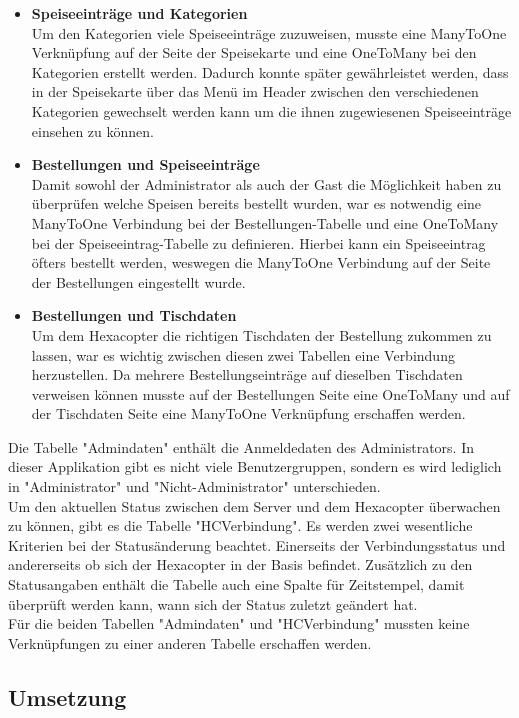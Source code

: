 \begin{itemize}
    \item \textbf{Speiseeinträge und Kategorien}\\
Um den Kategorien viele Speiseeinträge zuzuweisen, musste eine ManyToOne Verknüpfung auf der Seite der Speisekarte und eine OneToMany bei den Kategorien erstellt werden. Dadurch konnte später gewährleistet werden, dass in der Speisekarte über das Menü im Header zwischen den verschiedenen Kategorien gewechselt werden kann um die ihnen zugewiesenen Speiseeinträge einsehen zu können.
    \item \textbf{Bestellungen und Speiseeinträge}\\
Damit sowohl der Administrator als auch der Gast die Möglichkeit haben zu überprüfen welche Speisen bereits bestellt wurden, war es notwendig eine ManyToOne Verbindung bei der Bestellungen-Tabelle und eine OneToMany bei der Speiseeintrag-Tabelle zu definieren. Hierbei kann ein Speiseeintrag öfters bestellt werden, weswegen die ManyToOne Verbindung auf der Seite der Bestellungen eingestellt wurde. 
\pagebreak
    \item \textbf{Bestellungen und Tischdaten}\\ 
Um dem Hexacopter die richtigen Tischdaten der Bestellung zukommen zu lassen, war es wichtig zwischen diesen zwei Tabellen eine Verbindung herzustellen. Da mehrere Bestellungseinträge auf dieselben Tischdaten verweisen können musste auf der Bestellungen Seite eine OneToMany und auf der Tischdaten Seite eine ManyToOne Verknüpfung erschaffen werden.
  \end{itemize} 
Die Tabelle "Admindaten" enthält die Anmeldedaten des Administrators. In dieser Applikation gibt es nicht viele Benutzergruppen, sondern es wird lediglich in "Administrator" und "Nicht-Administrator" unterschieden.\\
Um den aktuellen Status zwischen dem Server und dem Hexacopter überwachen zu können, gibt es die Tabelle "HCVerbindung". Es werden zwei wesentliche Kriterien bei der Statusänderung beachtet. Einerseits der Verbindungsstatus und andererseits ob sich der Hexacopter in der Basis befindet. Zusätzlich zu den Statusangaben enthält die Tabelle auch eine Spalte für Zeitstempel, damit überprüft werden kann, wann sich der Status zuletzt geändert hat.\\
Für die beiden Tabellen "Admindaten" und "HCVerbindung" mussten keine Verknüpfungen zu einer anderen Tabelle erschaffen werden. 

  \subsection{Umsetzung}

